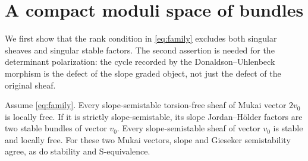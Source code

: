 \section{A compact moduli space of bundles}\label{sec:moduli}

We first show that the rank condition in \eqref{eq:family} excludes
both singular sheaves and singular stable factors. The second
assertion is needed for the determinant polarization: the cycle
recorded by the Donaldson--Uhlenbeck morphism is the defect of the
slope graded object, not just the defect of the original sheaf.

\begin{proposition}\label{prop:no-bubbling}
Assume \eqref{eq:family}. Every slope-semistable torsion-free sheaf
of Mukai vector $2v_0$ is locally free. If it is strictly
slope-semistable, its slope Jordan--H\"older factors are two stable
bundles of vector $v_0$. Every slope-semistable sheaf of vector
$v_0$ is stable and locally free. For these two Mukai vectors,
slope and Gieseker semistability agree, as do stability and
S-equivalence.
\end{proposition}

